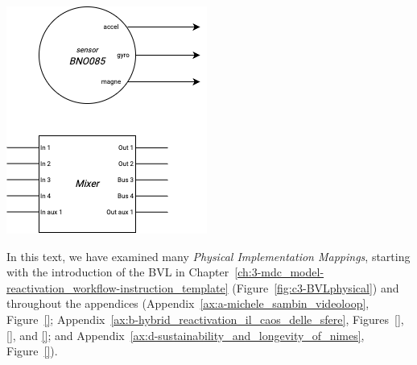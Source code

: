\begin{minipage}[t]{0.45\textwidth}
    \centering
    \includegraphics[width=\linewidth]{chapters/4-MDC_model_application/image/bvl-physical_level02.png}
    \label{fig:c4-physical_level02}
\end{minipage}
\newline
In this text, we have examined many \textit{Physical Implementation Mappings}, starting with the introduction of the BVL in Chapter~\ref{ch:3-mdc_model-reactivation_workflow-instruction_template} (Figure~\ref{fig:c3-BVLphysical}) and throughout the appendices (Appendix~\ref{ax:a-michele_sambin_videoloop}, Figure~\ref{}; Appendix~\ref{ax:b-hybrid_reactivation_il_caos_delle_sfere}, Figures~\ref{}, \ref{}, and \ref{}; and Appendix~\ref{ax:d-sustainability_and_longevity_of_nimes}, Figure~\ref{}).

